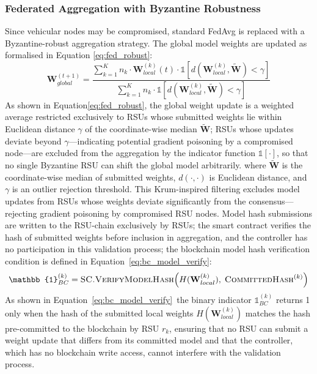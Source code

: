 \documentclass[12pt, a4paper]{report}
\begin{document}
\subsubsection{Federated Aggregation with Byzantine Robustness}
Since vehicular nodes may be compromised, standard FedAvg is replaced
with a Byzantine-robust aggregation strategy. The global model weights
are updated
as formalised in Equation \eqref{eq:fed_robust}:
\begin{equation}
\mathbf{W}_{global}^{(t+1)} =
\frac{\sum_{k=1}^{K} n_k \cdot \mathbf{W}_{local}^{(k)}(t)
\cdot \mathbb{1}\!\left[d\!\left(\mathbf{W}_{local}^{(k)},
\tilde{\mathbf{W}}\right) < \gamma\right]}
{\sum_{k=1}^{K} n_k \cdot \mathbb{1}\!\left[d\!\left(\mathbf{W}_{local}^{(k)},
\tilde{\mathbf{W}}\right) < \gamma\right]}
\label{eq:fed_robust}
\end{equation}
As shown in Equation\eqref{eq:fed_robust}{, the global weight
update is a weighted average restricted exclusively to RSUs whose
submitted weights lie within Euclidean distance $\gamma$ of the
coordinate-wise median $\tilde{\mathbf{W}}$; RSUs whose updates
deviate beyond $\gamma$---indicating potential gradient poisoning by
a compromised node---are excluded from the aggregation by the
indicator function $\mathbb{1}[\cdot]$, so that no single
Byzantine RSU can shift the global model arbitrarily.}
where $\tilde{\mathbf{W}}$ is the coordinate-wise median of submitted
weights, $d(\cdot,\cdot)$ is Euclidean distance, and $\gamma$ is an
outlier rejection threshold. This Krum-inspired filtering excludes
model updates from RSUs whose weights deviate significantly from the
consensus---rejecting gradient poisoning by compromised RSU nodes.
Model hash submissions are written to the RSU-chain exclusively by
RSUs; the smart contract verifies the hash of submitted weights
before inclusion in aggregation, and the controller has no
participation in this validation process;
the blockchain model hash verification condition is defined in
Equation~\eqref{eq:bc_model_verify}:
\begin{equation}
\mathbb{1}_{BC}^{(k)} = \textsc{SC.VerifyModelHash}\!\left(
H(\mathbf{W}_{local}^{(k)}),\; \textsc{CommittedHash}^{(k)}\right)
\label{eq:bc_model_verify}
\end{equation}
As shown in Equation~\eqref{eq:bc_model_verify}\, the binary
indicator $\mathbb{1}_{BC}^{(k)}$ returns 1 only when the hash of
the submitted local weights $H(\mathbf{W}_{local}^{(k)})$ matches
the hash pre-committed to the blockchain by RSU $r_k$, ensuring that
no RSU can submit a weight update that differs from its committed
model and that the controller, which has no blockchain write access,
cannot interfere with the validation process.
\end{document}
